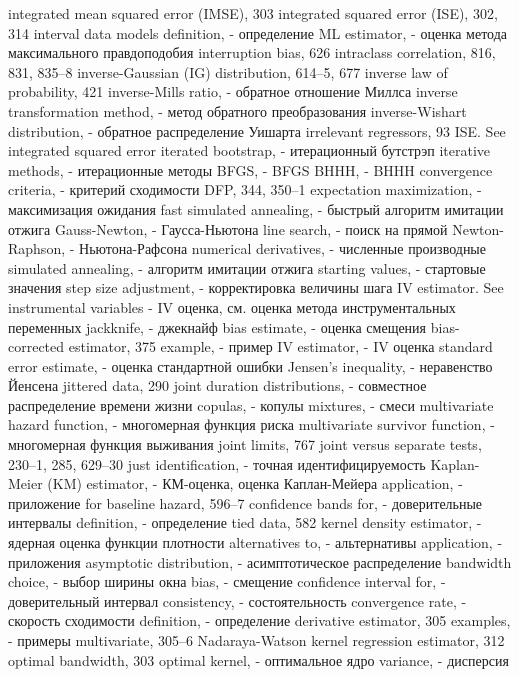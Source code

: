 integrated mean squared error (IMSE), 303 integrated squared error (ISE), 302, 314 
interval data models
definition, - определение
ML estimator, - оценка метода максимального правдоподобия
interruption bias, 626
intraclass correlation, 816, 831, 835–8 inverse-Gaussian (IG) distribution, 614–5, 677 inverse law of probability, 421
inverse-Mills ratio, - обратное отношение Миллса
inverse transformation method, - метод обратного преобразования 
inverse-Wishart distribution, - обратное распределение Уишарта 
irrelevant regressors, 93
ISE. See integrated squared error
iterated bootstrap, - итерационный бутстрэп
iterative methods, - итерационные методы
BFGS, - BFGS
BHHH, - BHHH
convergence criteria, - критерий сходимости
DFP, 344, 350–1
expectation maximization, - максимизация ожидания
fast simulated annealing, - быстрый алгоритм имитации отжига
Gauss-Newton, - Гаусса-Ньютона
line search, - поиск на прямой
Newton-Raphson, - Ньютона-Рафсона
numerical derivatives, - численные производные
simulated annealing, - алгоритм имитации отжига
starting values, - стартовые значения
step size adjustment, - корректировка величины шага
IV estimator. See instrumental variables - IV оценка, см. оценка метода инструментальных переменных
jackknife, - джекнайф
bias estimate, - оценка смещения
bias-corrected estimator, 375 
example, - пример
IV estimator, - IV оценка
standard error estimate, - оценка стандартной ошибки
Jensen’s inequality, - неравенство Йенсена
jittered data, 290
joint duration distributions, - совместное распределение времени жизни
copulas, - копулы
mixtures, - смеси
multivariate hazard function, - многомерная функция риска
multivariate survivor function, - многомерная функция выживания
joint limits, 767
joint versus separate tests, 230–1, 285, 629–30 
just identification, - точная идентифицируемость
Kaplan-Meier (KM) estimator, - КМ-оценка, оценка Каплан-Мейера 
application, - приложение
for baseline hazard, 596–7 
confidence bands for, - доверительные интервалы 
definition, - определение
tied data, 582
kernel density estimator, - ядерная оценка функции плотности
alternatives to, - альтернативы
application, - приложения
asymptotic distribution, - асимптотическое распределение
bandwidth choice, - выбор ширины окна
bias, - смещение
confidence interval for, - доверительный интервал
consistency, - состоятельность
convergence rate, - скорость сходимости
definition, - определение
derivative estimator, 305
examples, - примеры
multivariate, 305–6
Nadaraya-Watson kernel regression estimator, 312 optimal bandwidth, 303
optimal kernel, - оптимальное ядро
variance, - дисперсия
